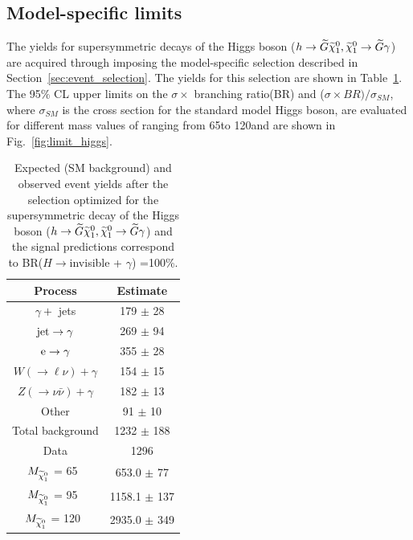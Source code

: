 \subsection{Model-specific limits}

   The yields for supersymmetric decays of the Higgs boson ($h\to \widetilde{G}\widetilde{\chi}^{0}_{1},\widetilde{\chi}^{0}_{1}\to\widetilde{G}\gamma$) are acquired through imposing the model-specific selection described in Section~\ref{sec:event_selection}. The yields for this selection are shown in Table~\ref{tab:exoh}. The 95$\%$ CL upper limits on the $\sigma \times$ branching ratio(BR) and ($\sigma \times BR )/ \sigma_{SM}$, where $\sigma_{SM}$ is the cross section for the standard model Higgs boson, are evaluated for different mass values of \PSGczDo ranging from 65\GeV to 120\GeV and are shown in Fig.~\ref{fig:limit_higgs}.   
                       
\begin{table}[H]
\centering
\begin{tabular}{|c|c|}
\hline
Process 						& 			Estimate \\ \hline
$\gamma +$ jets                         	& 			179 $\pm$ 28 \\
${\rm jet}\rightarrow \gamma$		& 			269 $\pm$ 94 \\
${\rm e} \rightarrow \gamma$		&			355 $\pm$ 28 \\
$W(\to \ell\nu)+\gamma $			&			154 $\pm$ 15 \\
$Z( \to \nu \bar{\nu} )+\gamma$  	&  			182 $\pm$ 13 \\
Other                                    		&  			91 $\pm$  10 \\ \hline
Total background                       		&   			1232 $\pm$ 188 \\ \hline
Data                                   		&  			1296  \\ \hline \hline
$M_{\widetilde{\chi}^{0}_{1}}$ = 65~\GeV 		& 			653.0 $\pm$ 77 \\
$M_{\widetilde{\chi}^{0}_{1}}$ = 95~\GeV 		& 			1158.1  $\pm$ 137\\
$M_{\widetilde{\chi}^{0}_{1}}$ = 120~\GeV 		& 			2935.0 $\pm$ 349 \\ \hline
\end{tabular}

\caption{Expected (SM background) and observed event yields after the selection optimized for the supersymmetric decay of the Higgs boson ($h\to\widetilde{G}\widetilde{\chi}^{0}_{1},\widetilde{\chi}^{0}_{1}\to\widetilde{G}\gamma$) and the signal predictions  correspond to BR($H \rightarrow $invisible + $\gamma$) =100\%.}

\label{tab:exoh}

\end{table}


